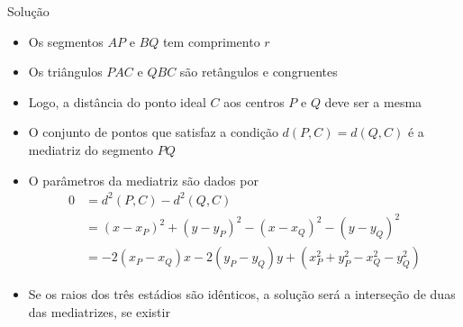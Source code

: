 \begin{frame}[fragile]{Solução}

    \begin{itemize}
        \item Os segmentos $AP$ e $BQ$ tem comprimento $r$
        \pause

        \item Os triângulos $PAC$ e $QBC$ são retângulos e congruentes
        \pause

        \item Logo, a distância do ponto ideal $C$ aos centros $P$ e $Q$ deve ser a mesma
        \pause

        \item O conjunto de pontos que satisfaz a condição $d(P, C) = d(Q, C)$ é a mediatriz do
            segmento $PQ$
        \pause

        \item O parâmetros da mediatriz são dados por
        \begin{align*}
            0 &= d^2(P, C) - d^2(Q, C) \\
            &= (x - x_P)^2 + (y - y_P)^2 - (x - x_Q)^2 - (y - y_Q)^2 \\
            &= -2(x_P - x_Q)x -2(y_P - y_Q)y + (x_P^2 + y_P^2 - x_Q^2 - y_Q^2)
        \end{align*}
        \pause
            
        \item Se os raios dos três estádios são idênticos, a solução será a interseção de 
            duas das mediatrizes, se existir
    \end{itemize}

\end{frame}

